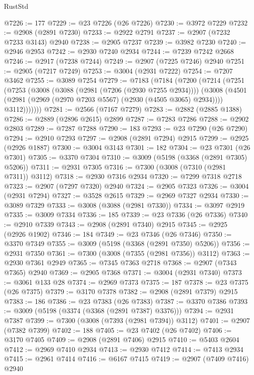 \begin{lexlean}{RustStd}
\begin{coremodule}
@7226 := 177
@7229 := @23 @7226 (@26 @7226)
@7230 := @3972 @7229
@7232 := @2908 (@2891 @7230)
@7233 := @2922 @2791
@7237 := @2907 (@7232 @7233 @3143) @2940
@7238 := @2905 @7237
@7239 := @3982 @7230
@7240 := @2946 @2953
@7242 := @2930 @7240 @2934
@7244 := @7239 @7242 @2668
@7246 := @2917 (@7238 @7244)
@7249 := @2907 (@7225 @7246) @2940
@7251 := @2905 (@7217 @7249)
@7253 := @3004 (@2931 @7222)
@7254 := @7207 @3462
@7255 := @3089 @7254
@7279 := @7183
    (@7184
      (@7200
        (@7214
          (@7251
            (@7253
              (@3008
                (@3088 (@2981 (@7206 (@2930 @7255 @2934))))
                (@3008
                  (@4501 (@2981 (@2969 (@2970 @7203 @5567) (@2930 (@4505 @3065) @2934))))
                  @3112)))))))
@7281 := @2566 (@7167 @7279)
@7283 := @2882 (@2885 @1388)
@7286 := @2889 (@2896 @2615) @2899
@7287 := @7283 @7286
@7288 := @2902 @2803
@7289 := @7287 @7288
@7290 := 183
@7293 := @23 @7290 (@26 @7290)
@7294 := @2910 @7293
@7297 := @2908 (@2891 @7294) @2915
@7299 := @2925 (@2926 @1887)
@7300 := @3004 @3143
@7301 := 182
@7304 := @23 @7301 (@26 @7301)
@7305 := @3370 @7304
@7310 := @3009 (@5198 (@3368 (@2891 @7305) @5206))
@7311 := @2931 @7305
@7316 := @7300 (@3008 (@7310 (@2981 @7311)) @3112)
@7318 := @2930 @7316 @2934
@7320 := @7299 @7318 @2718
@7323 := @2907 (@7297 @7320) @2940
@7324 := @2905 @7323
@7326 := @3004 (@2931 @7294)
@7327 := @3528 @2615
@7329 := @2969 @7327 @2934
@7330 := @3089 @7329
@7333 := @3008 (@3088 (@2981 @7330))
@7334 := @3097 @2919
@7335 := @3009 @7334
@7336 := 185
@7339 := @23 @7336 (@26 @7336)
@7340 := @2910 @7339
@7343 := @2908 (@2891 @7340) @2915
@7345 := @2925 (@2926 @1902)
@7346 := 184
@7349 := @23 @7346 (@26 @7346)
@7350 := @3370 @7349
@7355 := @3009 (@5198 (@3368 (@2891 @7350) @5206))
@7356 := @2931 @7350
@7361 := @7300 (@3008 (@7355 (@2981 @7356)) @3112)
@7363 := @2930 @7361 @2949
@7365 := @7345 @7363 @2718
@7368 := @2907 (@7343 @7365) @2940
@7369 := @2905 @7368
@7371 := @3004 (@2931 @7340)
@7373 := @3061 @133 @28
@7374 := @2969 @7373
@7375 := 187
@7378 := @23 @7375 (@26 @7375)
@7379 := @3170 @7378
@7382 := @2908 (@2891 @7379) @2915
@7383 := 186
@7386 := @23 @7383 (@26 @7383)
@7387 := @3370 @7386
@7393 := @3009 (@5198 (@3374 (@3368 (@2891 @7387) @3376)))
@7394 := @2931 @7387
@7399 := @7300 (@3008 (@7393 (@2981 @7394)) @3112)
@7401 := @2907 (@7382 @7399)
@7402 := 188
@7405 := @23 @7402 (@26 @7402)
@7406 := @3170 @7405
@7409 := @2908 (@2891 @7406) @2915
@7410 := @5403 @2604
@7412 := @2969 @7410 @2934
@7413 := @2930 @7412
@7414 := @7413 @2934
@7415 := @2961 @7414
@7416 := @6167 @7415
@7419 := @2907 (@7409 @7416) @2940

\end{coremodule}
\end{lexlean}
